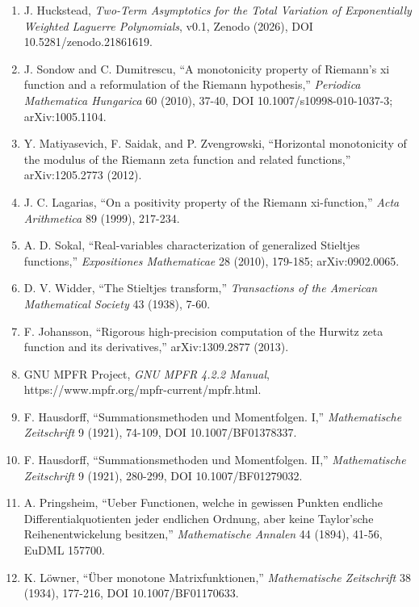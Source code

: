 \documentclass[
  11pt,
]{book}
\begin{document}
\begin{enumerate}
  J. Huckstead, \emph{From Measure to Flux: Energy-Conjugate Bookkeeping
  and Exact Semidiscrete Scattering in Finite Radial Wave Models},
  publication layer v0.6.13, Zenodo (2026), DOI 10.5281/zenodo.21444339.
\item
  J. Huckstead, \emph{Two-Term Asymptotics for the Total Variation of
  Exponentially Weighted Laguerre Polynomials}, v0.1, Zenodo (2026), DOI
  10.5281/zenodo.21861619.
\item
  J. Sondow and C. Dumitrescu, ``A monotonicity property of Riemann's xi
  function and a reformulation of the Riemann hypothesis,''
  \emph{Periodica Mathematica Hungarica} 60 (2010), 37-40, DOI
  10.1007/s10998-010-1037-3; arXiv:1005.1104.
\item
  Y. Matiyasevich, F. Saidak, and P. Zvengrowski, ``Horizontal
  monotonicity of the modulus of the Riemann zeta function and related
  functions,'' arXiv:1205.2773 (2012).
\item
  J. C. Lagarias, ``On a positivity property of the Riemann
  xi-function,'' \emph{Acta Arithmetica} 89 (1999), 217-234.
\item
  A. D. Sokal, ``Real-variables characterization of generalized
  Stieltjes functions,'' \emph{Expositiones Mathematicae} 28 (2010),
  179-185; arXiv:0902.0065.
\item
  D. V. Widder, ``The Stieltjes transform,'' \emph{Transactions of the
  American Mathematical Society} 43 (1938), 7-60.
\item
  F. Johansson, ``Rigorous high-precision computation of the Hurwitz
  zeta function and its derivatives,'' arXiv:1309.2877 (2013).
\item
  GNU MPFR Project, \emph{GNU MPFR 4.2.2 Manual},
  https://www.mpfr.org/mpfr-current/mpfr.html.
\item
  F. Hausdorff, ``Summationsmethoden und Momentfolgen. I,''
  \emph{Mathematische Zeitschrift} 9 (1921), 74-109, DOI
  10.1007/BF01378337.
\item
  F. Hausdorff, ``Summationsmethoden und Momentfolgen. II,''
  \emph{Mathematische Zeitschrift} 9 (1921), 280-299, DOI
  10.1007/BF01279032.
\item
  A. Pringsheim, ``Ueber Functionen, welche in gewissen Punkten endliche
  Differentialquotienten jeder endlichen Ordnung, aber keine Taylor'sche
  Reihenentwickelung besitzen,'' \emph{Mathematische Annalen} 44 (1894),
  41-56, EuDML 157700.
\item
  K. Löwner, ``Über monotone Matrixfunktionen,'' \emph{Mathematische
  Zeitschrift} 38 (1934), 177-216, DOI 10.1007/BF01170633.

\end{enumerate}
\end{document}

